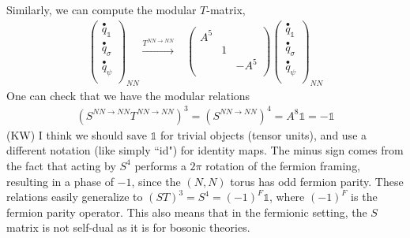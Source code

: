 \documentclass[12pt,a4paper]{article}
\newcounter{arrow}
\newcommand{\ra}{\rightarrow}
\newcommand{\unit}{\mathds{1}}
\newcommand{\kw}[1]{{\color{kwcolor}\footnotesize{(KW) #1}}}
\begin{document}
Similarly, we can compute the modular $T$-matrix, 
\begin{align}
\left( \begin{matrix}
\overset{\bullet}{q}_\unit\\
\overset{\bullet}{q}_\sigma\\
\overset{\bullet}{q}_\psi\\
\end{matrix} \right)_{NN} 
\xrightarrow{T^{NN \rightarrow NN}} &\left( \begin{matrix}
A^5& &\\
&1&\\
&&-A^5\\
\end{matrix} \right)
\left( \begin{matrix}
\overset{\bullet}{q}_\unit\\
\overset{\bullet}{q}_\sigma\\
\overset{\bullet}{q}_\psi\\
\end{matrix} \right)_{NN}
\end{align}
One can check that we have the modular relations
\begin{align}
 (S^{NN\ra NN}T^{NN\ra NN})^3 = (S^{NN \ra NN})^4= A^{8}\unit = -\unit
 \end{align}
\kw{I think we should save $\unit$ for trivial objects (tensor units), and use a different notation
(like simply ``id") for identity maps.}
The minus sign comes from the fact that acting by $S^4$ performs a $2\pi$ rotation 
of the fermion framing, resulting in a phase of $-1$, since the $(N,N)$ torus has odd fermion parity. 
These relations easily generalize to $(ST)^3=S^4=(-1)^F\unit$, where $(-1)^F$ is the fermion 
parity operator. 
This also means that in the fermionic setting, 
the $S$ matrix is not self-dual as it is for bosonic theories.


\medskip
\end{document}
